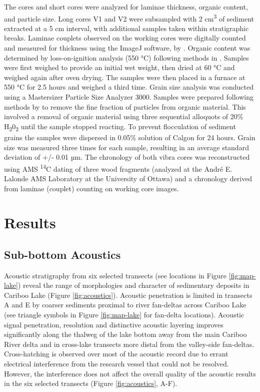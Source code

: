 \documentclass[Royal,times,doublespace,sageh]{sagej}
\begin{document}
The cores and short cores were analyzed for laminae thickness, organic
content, and particle size. Long cores V1 and V2 were subsampled with 2
cm\textsuperscript{3} of sediment extracted at a 5 cm interval, with
additional samples taken within stratigraphic breaks. Laminae couplets
observed on the working cores were digitally counted and measured for
thickness using the ImageJ software, by \citet{Schneider2012}. Organic
content was determined by loss-on-ignition analysis (550 °C) following
methods in \citet{Smith2003}. Samples were first weighed to provide an
initial wet weight, then dried at 60 °C and weighed again after oven
drying. The samples were then placed in a furnace at 550 °C for 2.5
hours and weighed a third time. Grain size analysis was conducted using
a Mastersizer Particle Size Analyzer 3000. Samples were prepared
following methods by \citet{Gray2010} to remove the fine fraction of
particles from organic material. This involved a removal of organic
material using three sequential alloquots of 20\%
H\textsubscript{2}0\textsubscript{2} until the sample stopped reacting.
To prevent flocculation of sediment grains the samples were dispersed in
0.05\% solution of Calgon for 24 hours. Grain size was measured three
times for each sample, resulting in an average standard deviation of +/-
0.01 µm. The chronology of both vibra cores was reconstructed using AMS
\textsuperscript{14}C dating of three wood fragments (analyzed at the
André E. Lalonde AMS Laboratory at the University of Ottawa) and a
chronology derived from laminae (couplet) counting on working core
images.

\hypertarget{results}{%
\section{Results}\label{results}}

\hypertarget{sub-bottom-acoustics}{%
\subsection{Sub-bottom Acoustics}\label{sub-bottom-acoustics}}

Acoustic stratigraphy from six selected transects (see locations in
Figure \ref{fig:map-lake}) reveal the range of morphologies and
character of sedimentary deposits in Cariboo Lake (Figure
\ref{fig:acoustics}). Acoustic penetration is limited in transects A and
E by coarser sediments proximal to river fan-deltas across Cariboo Lake
(see triangle symbols in Figure \ref{fig:map-lake} for fan-delta
locations). Acoustic signal penetration, resolution and distinctive
acoustic layering improves significantly along the thalweg of the lake
bottom away from the main Cariboo River delta and in cross-lake
transects more distal from the valley-side fan-deltas. Cross-hatching is
observed over most of the acoustic record due to errant electrical
interference from the research vessel that could not be resolved.
However, the interference does not affect the overall quality of the
acoustic results in the six selected transects (Figure
\ref{fig:acoustics}, A-F).
\end{document}
